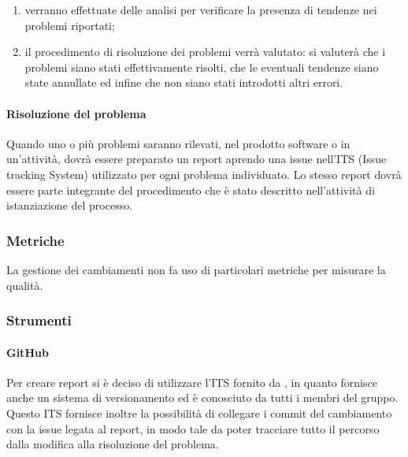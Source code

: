 \begin{enumerate}
				\item verranno effettuate delle analisi per verificare la presenza di tendenze nei problemi riportati;

				\item il procedimento di risoluzione dei problemi verrà valutato: si valuterà che i problemi siano stati effettivamente risolti, che le eventuali tendenze siano state annullate ed infine che non siano stati introdotti altri errori.
			\end{enumerate}
		\paragraph{Risoluzione del problema}
			Quando uno o più problemi saranno rilevati, nel prodotto software o in un'attività, dovrà essere preparato un report aprendo una issue nell'ITS (Issue tracking System) utilizzato per ogni problema individuato. Lo stesso report dovrà essere parte integrante del procedimento che è stato descritto nell'attività di istanziazione del processo.
	\subsubsection{Metriche}
		La gestione dei cambiamenti non fa uso di particolari metriche per misurare la qualità.
	\subsubsection{Strumenti}
		\paragraph{GitHub}
			Per creare report si è deciso di utilizzare l'ITS fornito da , in quanto fornisce anche un sistema di versionamento ed è conosciuto da tutti i membri del gruppo.
			Questo ITS fornisce inoltre la possibilità di collegare i commit del cambiamento con la issue legata al report, in modo tale da poter tracciare tutto il percorso dalla modifica alla risoluzione del problema.
